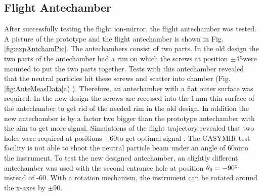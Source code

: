 	\subsection{Flight Antechamber}
	After successfully testing the flight ion-mirror, the flight antechamber was tested. A picture of the prototype and the flight antechamber is shown in Fig.\,\ref{fig:expAntchamPic}. The antechambers consist of two parts. In the old design the two parts of the antechamber had a rim on which the screws at position $\pm$45\degree were mounted to put the two parts together. Tests with this antechamber revealed that the neutral particles hit these screws and scatter into chamber (Fig.\ref{fig:AnteMeasData}a) \cite{Meyer_2017_ante}). Therefore, an antechamber with a flat outer surface was required. In the new design the screws are recessed into the 1\,\si{\milli\meter} thin surface of the antechamber to get rid of the needed rim in the old design. In addition the new antechamber is by a factor two bigger than the prototype antechamber with the aim to get more signal. Simulations of the flight trajectory revealed that two holes were required at positions $\pm$60\degree to get optimal signal \cite{SOC_Crema3p2}. The CASYMIR test facility is not able to shoot the neutral particle beam under an angle of 60\degree onto the instrument. To test the new designed antechamber, an slightly different antechamber was used with the second entrance hole at position $\theta_0 = -90^\circ$ instead of -60\degree. With a rotation mechanism, the instrument can be rotated around the x-axes by $\pm$90\degree.\\
